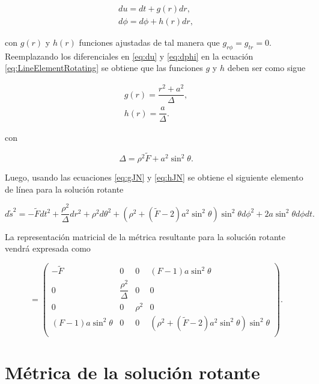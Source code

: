 \begin{gather}
    du = dt+g(r)dr, \label{eq:du}\\
    d\phi = d\phi+h(r)dr \label{eq:dphi},
\end{gather}

con $g(r)$ y $h(r)$ funciones ajustadas de tal manera que $g_{r\phi}=g_{tr}=0$. Reemplazando los diferenciales en \eqref{eq:du} y \eqref{eq:dphi} en la ecuación \eqref{eq:LineElementRotating} se obtiene que las funciones $g$ y $h$ deben ser como sigue 

\begin{gather}
    g(r) =  \dfrac{r^2+a^2}{\Delta}, \label{eq:gJN}\\
    h(r) =  \dfrac{a}{\Delta}. \label{eq:hJN}
\end{gather}

con 

\begin{equation}
    \Delta = \rho^2\tilde{F}+a^2\sin^2\theta.
\end{equation}

Luego, usando las ecuaciones \eqref{eq:gJN} y \eqref{eq:hJN} se obtiene el siguiente elemento de línea para la solución rotante

\begin{equation}
        d\tilde{s}^2= -\tilde{F}dt^2+\dfrac{\rho^2}{\Delta}dr^2+\rho^2d\theta^2+(\rho^2+(\tilde{F}-2)a^2\sin^2\theta)\sin^2\theta d\phi^2 + 2a\sin^2\theta d\phi dt.
        \label{eq:tildeElementoDeLinea}
\end{equation}

La representación matricial de la métrica resultante para la solución rotante vendrá expresada como

\begin{equation}
    [\tilde{g}_{\mu\nu}]=
    \begin{pmatrix}
        -\tilde{F}& 0 & 0 & (F-1)a\sin^2\theta\\
        0&  \dfrac{\rho^2}{\Delta}& 0&  0 \\
        0&  0&  \rho^2& 0\\
        (F-1)a\sin^2\theta&  0&  0&  (\rho^2+(\tilde{F}-2)a^2\sin^2\theta)\sin^2\theta\\  \label{eq:TildeMétrica}
    \end{pmatrix}.
\end{equation}

\section{Métrica de la solución rotante}

